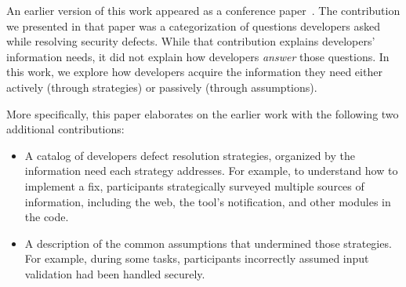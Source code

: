 \documentclass[10pt,journal,compsoc]{IEEEtran}
\begin{document}
%
%
%
%

An earlier version of this work appeared as a conference paper~\cite{Smith2015Questions}. 
The contribution we presented in that paper was a categorization of questions developers asked while resolving security defects.
While that contribution explains developers' information needs, it did not explain how developers \textit{answer} those questions.
In this work, we explore how developers acquire the information they need either actively (through strategies) or passively (through assumptions).


More specifically, this paper elaborates on the earlier work with the following two additional contributions:

\begin{itemize}
	\item A catalog of developers defect resolution strategies, organized by the information need each strategy addresses. 
	For example, to understand how to implement a fix, participants strategically surveyed multiple sources of information, including the web, the tool's notification, and other modules in the code.
	\item A description of the common assumptions that undermined those strategies. 
	For example, during some tasks, participants incorrectly assumed input validation had been handled securely.
\end{itemize}
\end{document}
